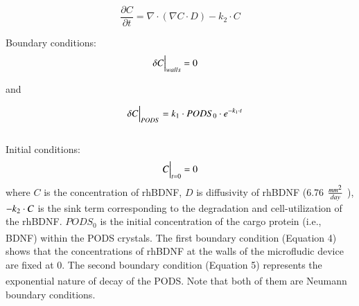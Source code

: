 \documentclass[review]{elsarticle}
\begin{document}

\begin{equation}
\renewcommand{\vec}[1]{\boldsymbol{#1}}
\frac{\partial C}{\partial t}
= \nabla\cdot\left(\nabla C\cdot D\right)-k_{2}\cdot C
\end{equation}

Boundary conditions:
\begin{equation}
\delta C \Big{|}_{walls}= 0\quad 
\end{equation}

\begin{center}
and
\end{center}

\begin{equation}
\quad\delta C\Big{|}_{PODS}
=k_1 \cdot PODS_0 \cdot e^{-k_1 \cdot t}
\end{equation}
\\
Initial conditions: 
\begin{equation}
C\Big{|}_{t=0} = 0
\end{equation}
where $C$ is the concentration of rhBDNF, $D$ is diffusivity of rhBDNF (6.76 $\frac{mm\textsuperscript{2}}{day} $ \cite{Stroh2004}), $-k\textsubscript{2}\cdot C$ is the sink term corresponding to the degradation and cell-utilization of the rhBDNF. $PODS_{0}$ is the initial concentration of the cargo protein (i.e., BDNF) within the PODS\textsuperscript{\textregistered} crystals. The first boundary condition (Equation 4) shows that the concentrations of rhBDNF at the walls of the microfludic device are fixed at 0. The second boundary condition (Equation 5) represents the exponential nature of decay of the PODS\textsuperscript{\textregistered}. Note that both of them are Neumann boundary conditions. 
\end{document}
